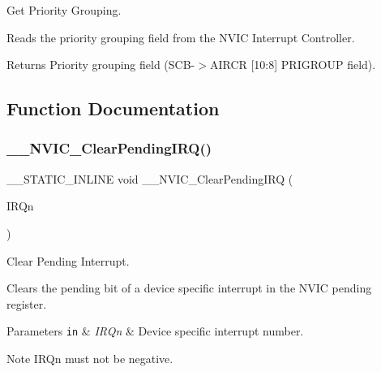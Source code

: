 Get Priority Grouping. 

Reads the priority grouping field from the N\+V\+IC Interrupt Controller. \begin{DoxyReturn}{Returns}
Priority grouping field (S\+C\+B-\/$>$A\+I\+R\+CR \mbox{[}10\+:8\mbox{]} P\+R\+I\+G\+R\+O\+UP field). 
\end{DoxyReturn}


\subsection{Function Documentation}
\mbox{\label{group___c_m_s_i_s___core___n_v_i_c_functions_ga562a86dbdf14827d0fee8fdafb04d191}} 
\subsubsection{\texorpdfstring{\+\_\+\+\_\+\+N\+V\+I\+C\+\_\+\+Clear\+Pending\+I\+R\+Q()}{\_\_NVIC\_ClearPendingIRQ()}}
{\footnotesize\ttfamily \+\_\+\+\_\+\+S\+T\+A\+T\+I\+C\+\_\+\+I\+N\+L\+I\+NE void \+\_\+\+\_\+\+N\+V\+I\+C\+\_\+\+Clear\+Pending\+I\+RQ (\begin{DoxyParamCaption}\item[{\hyperlink{group___peripheral__interrupt__number__definition_ga7e1129cd8a196f4284d41db3e82ad5c8}{I\+R\+Qn\+\_\+\+Type}}]{I\+R\+Qn }\end{DoxyParamCaption})}



Clear Pending Interrupt. 

Clears the pending bit of a device specific interrupt in the N\+V\+IC pending register. 
\begin{DoxyParams}[1]{Parameters}
\mbox{\tt in}  & {\em I\+R\+Qn} & Device specific interrupt number. \\
\hline
\end{DoxyParams}
\begin{DoxyNote}{Note}
I\+R\+Qn must not be negative. 
\end{DoxyNote}
\mbox{\label{group___c_m_s_i_s___core___n_v_i_c_functions_gae016e4c1986312044ee768806537d52f}} 
